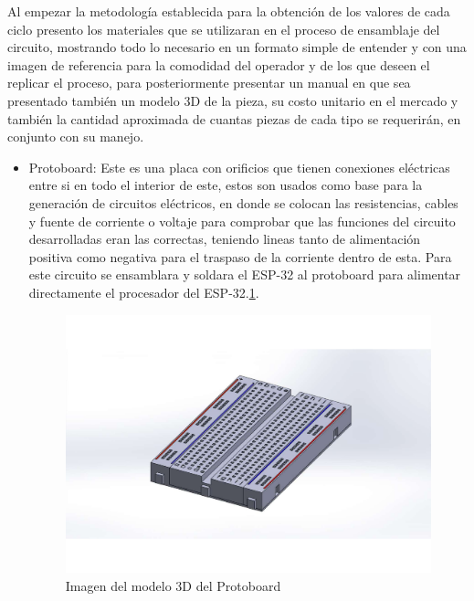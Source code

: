         Al empezar la metodología establecida para la obtención de los valores de cada ciclo presento los materiales que se utilizaran en el proceso de ensamblaje del circuito, mostrando todo lo necesario en un formato simple de entender y con una imagen de referencia para la comodidad del operador y de los que deseen el replicar el proceso, para posteriormente presentar un manual en que sea presentado también un modelo 3D de la pieza, su costo unitario en el mercado y también la cantidad aproximada de cuantas piezas de cada tipo se requerirán, en conjunto con su manejo.
    
    
        \begin{itemize}
            \item Protoboard: Este es una placa con orificios que tienen conexiones eléctricas entre si en todo el interior de este, estos son usados como base para la generación de circuitos eléctricos, en donde se colocan las resistencias, cables y fuente de corriente o voltaje para comprobar que las funciones del circuito desarrolladas eran las correctas, teniendo lineas tanto de alimentación positiva como negativa para el traspaso de la corriente dentro de esta. Para este circuito se ensamblara y soldara  el ESP-32 al protoboard para alimentar directamente el procesador del ESP-32.\ref{fig:protoboard}.
    
            \begin{figure}[H]
        \centering
        \includegraphics[trim = {65mm 40mm 65mm 40mm},clip,scale=0.5]{19/Img/protoboardFigura.pdf}
        \caption{Imagen del modelo 3D del Protoboard}
        \label{fig:protoboard}
    \end{figure}
    

\end{itemize}
